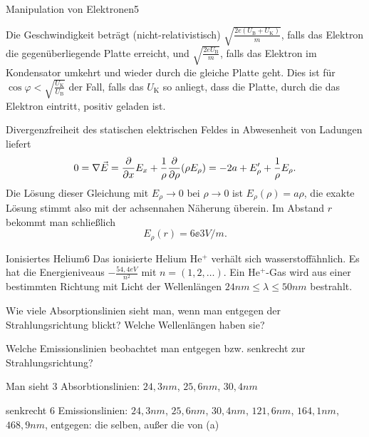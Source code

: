 \begin{problem}{Manipulation von Elektronen}{5}
\begin{solution}
\begin{abcenum}
\item Die Geschwindigkeit beträgt (nicht-relativistisch) $\sqrt{\frac{2e(U_\mathrm{B}+U_\mathrm{K})}{m}}$, falls das Elektron die gegen\-über\-liegende Platte erreicht, und $\sqrt{\frac{2eU_\mathrm{B}}{m}}$, falls das Elektron im Kondensator umkehrt und wieder durch die gleiche Platte geht. Dies ist für $\cos\varphi<\sqrt{\frac{U_\mathrm{K}}{U_\mathrm{B}}}$
der Fall, falls das $U_\mathrm{K}$ so anliegt, dass die Platte, durch die das Elektron eintritt, positiv geladen ist.\\
\item Divergenzfreiheit des statischen elektrischen Feldes in Abwesenheit von Ladungen liefert
\[
0 = \nabla \vec E = \frac{\partial}{\partial x} E_x + \frac1\rho \frac{\partial}{\partial\rho} (\rho E_\rho) = -2 a + E_\rho' + \frac{1}{\rho} E_\rho.
\]
Die Lösung dieser Gleichung mit $E_\rho \to 0$ bei $\rho \to 0$ ist $E_\rho(\rho) = a \rho$, die exakte Lösung stimmt also mit der achsennahen Näherung überein. Im Abstand $r$ bekommt man schließlich
\[
E_\rho(r)=6\ee{3}\unit{V/m}.
\]
\end{abcenum}
\end{solution}
\end{problem}


\begin{problem}{Ionisiertes Helium}{6}
Das ionisierte Helium He$^+$ verhält sich wasserstoffähnlich. Es hat die Energieniveaus
$-\frac{54,4\unit{eV}}{n^2}$ mit $n=(1,2,\ldots)$. Ein He$^+$-Gas wird aus einer bestimmten Richtung
mit Licht der Wellenlängen $24\unit{nm}\leq\lambda\leq50\unit{nm}$ bestrahlt.
\begin{abcenum}
\item Wie viele Absorptionslinien sieht man, wenn man entgegen der Strahlungsrichtung blickt? Welche Wellenlängen haben sie?
\item Welche Emissionslinien beobachtet man entgegen bzw. senkrecht zur Strahlungsrichtung?
\end{abcenum}
\begin{solution}
\begin{abcenum}
\item Man sieht 3 Absorbtionslinien: $24,3\unit{nm}$, $25,6\unit{nm}$, $30,4\unit{nm}$
\item senkrecht 6 Emissionslinien: $24,3\unit{nm}$, $25,6\unit{nm}$, $30,4\unit{nm}$, $121,6\unit{nm}$, $164,1\unit{nm}$, $468,9\unit{nm}$, entgegen: die selben, außer die von (a)
\end{abcenum}
\end{solution}
\end{problem}


